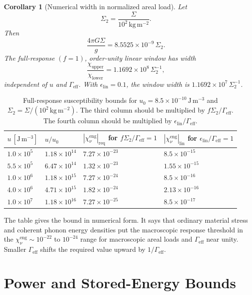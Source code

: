 \documentclass[11pt]{article}
\numberwithin{equation}{section}
\newtheorem{corollary}[theorem]{Corollary}
\theoremstyle{remark}
\newcommand{\chieng}{\chi_\nu^{\mathrm{eng}}}
\newcommand{\Gammaeff}{\Gamma_{\mathrm{eff}}}
\begin{document}
\begin{corollary}[Numerical width in normalized areal load]
Let
\[
\Sigma_2=\frac{\Sigma}{10^2\,\mathrm{kg\,m^{-2}}}.
\]
Then
\[
\frac{4\pi G\Sigma}{g}=8.5525\times10^{-9}\,\Sigma_2.
\]
The full-response \((f=1)\), order-unity linear window has width
\[
\frac{\chi_{\mathrm{upper}}}{\chi_{\mathrm{lower}}}
=
1.1692\times10^8\,\Sigma_2^{-1},
\]
independent of \(u\) and \(\Gammaeff\). With
\(\epsilon_{\mathrm{lin}}=0.1\), the window width is
\(1.1692\times10^7\,\Sigma_2^{-1}\).
\end{corollary}

\begin{table}[h]
\centering
\begin{tabular}{@{}R{0.19\textwidth}R{0.23\textwidth}R{0.25\textwidth}R{0.20\textwidth}@{}}
\toprule
\(u\,[\mathrm{J\,m^{-3}}]\) &
\(u/u_0\) &
\(|\chieng|_{\mathrm{req}}\) for \(f\Sigma_2/\Gammaeff=1\) &
\(|\chieng|_{\mathrm{lin}}\) for \(\epsilon_{\mathrm{lin}}/\Gammaeff=1\) \\
\midrule
\(1.0\times10^5\) & \(1.18\times10^{14}\) & \(7.27\times10^{-23}\) & \(8.5\times10^{-15}\) \\
\(5.5\times10^5\) & \(6.47\times10^{14}\) & \(1.32\times10^{-23}\) & \(1.55\times10^{-15}\) \\
\(1.0\times10^6\) & \(1.18\times10^{15}\) & \(7.27\times10^{-24}\) & \(8.5\times10^{-16}\) \\
\(4.0\times10^6\) & \(4.71\times10^{15}\) & \(1.82\times10^{-24}\) & \(2.13\times10^{-16}\) \\
\(1.0\times10^7\) & \(1.18\times10^{16}\) & \(7.27\times10^{-25}\) & \(8.5\times10^{-17}\) \\
\bottomrule
\end{tabular}
\caption{Full-response susceptibility bounds for \(u_0=8.5\times10^{-10}\,\mathrm{J\,m^{-3}}\) and \(\Sigma_2=\Sigma/(10^2\,\mathrm{kg\,m^{-2}})\). The third column should be multiplied by \(f\Sigma_2/\Gammaeff\). The fourth column should be multiplied by \(\epsilon_{\mathrm{lin}}/\Gammaeff\).}
\label{tab:window}
\end{table}

The table gives the bound in numerical form. It says that
ordinary material stress and coherent phonon energy densities put the
macroscopic response threshold in the \(\chieng\sim10^{-22}\) to \(10^{-24}\)
range for macroscopic areal loads and \(\Gammaeff\) near unity. Smaller
\(\Gammaeff\) shifts the required value upward by \(1/\Gammaeff\).

\section{Power and Stored-Energy Bounds}
\end{document}
